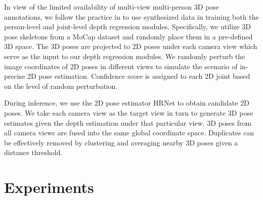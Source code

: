 \documentclass[final]{cvpr}
\begin{document}
In view of the limited availability of multi-view multi-person 3D pose annotations, we follow the practice in \cite{tu2020voxelpose} to use synthesized data in training both the person-level and joint-level depth regression modules.
Specifically, we utilize 3D pose skeletons from a MoCap dataset and randomly place them in a pre-defined 3D space.
The 3D poses are projected to 2D poses under each camera view which serve as the input to our depth regression modules.
We randomly perturb the image coordinates of 2D poses in different views to simulate the scenario of in-precise 2D pose estimation.
Confidence score is assigned to each 2D joint based on the level of random perturbation.

During inference, we use the 2D pose estimator HRNet \cite{sun2019deep} to obtain candidate 2D poses.
We take each camera view as the target view in turn to generate 3D pose estimates given the depth estimation under that particular view.
3D poses from all camera views are fused into the same global coordinate space.
Duplicates can be effectively removed by clustering and averaging nearby 3D poses given a distance threshold.

\begin{table}[t]
    \centering
    \caption{Comparison of PCP between the soft-argmax operations used in the person-level depth regression on the Campus and the Shelf datasets.}
    \label{tab:soft-argmax}
\end{table}


\section{Experiments}\label{sec:experiments}
\end{document}
